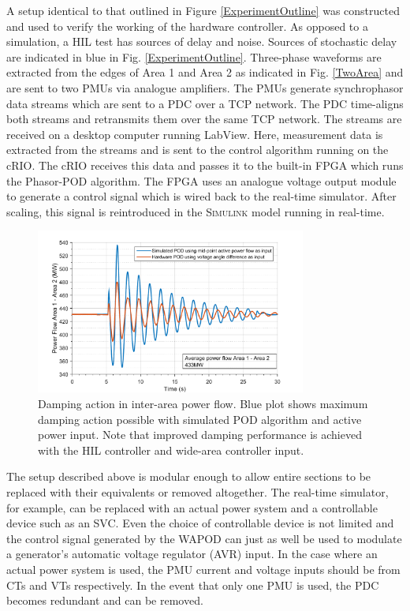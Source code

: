 \documentclass[conference]{IEEEtran}
\begin{document}
A setup identical to that outlined in Figure \ref{ExperimentOutline} was constructed and used to verify the working of the hardware controller. As opposed to a simulation, a HIL test has sources of delay and noise. Sources of stochastic delay are indicated in blue in Fig. \ref{ExperimentOutline}. Three-phase waveforms are extracted from the edges of Area 1 and Area 2 as indicated in Fig. \ref{TwoArea} and are sent to two PMUs via analogue amplifiers. The PMUs generate synchrophasor data streams which are sent to a PDC over a TCP network. The PDC time-aligns both streams and retransmits them over the same TCP network. The streams are received on a desktop computer running LabView. Here, measurement data is extracted from the streams and is sent to the control algorithm running on the cRIO. The cRIO receives this data and passes it to the built-in FPGA which runs the Phasor-POD algorithm. The FPGA uses an analogue voltage output module to generate a control signal which is wired back to the real-time simulator. After scaling, this signal is reintroduced in the \textsc{Simulink} model running in real-time.\\

\begin{figure}[htb]
	\includegraphics[width=3.5in]{SVC_ResponseComparison_Labelled.pdf} 
	\caption{Damping action in inter-area power flow. Blue plot shows maximum damping action possible with simulated POD algorithm and active power input. Note that improved damping performance is achieved with the HIL controller and wide-area controller input.}
	\label{HILGraph}
\end{figure}

The setup described above is modular enough to allow entire sections to be replaced with their equivalents or removed altogether. The real-time simulator, for example, can be replaced with an actual power system and a controllable device such as an SVC. Even the choice of controllable device is not limited and the control signal generated by the WAPOD can just as well be used to modulate a generator's automatic voltage regulator (AVR) input. In the case where an actual power system is used, the PMU current and voltage inputs should be from CTs and VTs respectively. In the event that only one PMU is used, the PDC becomes redundant and can be removed.\\
\end{document}
